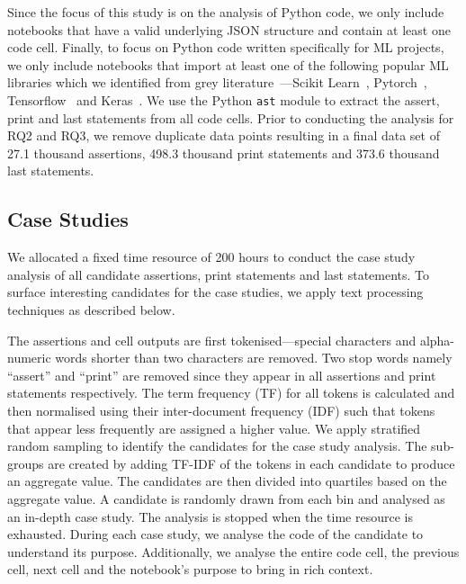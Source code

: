 Since the focus of this study is on the analysis of Python code, we only include notebooks that have a valid underlying JSON structure and contain at least one code cell. Finally, to focus on Python code written specifically for ML projects, we only include notebooks that import at least one of the following popular ML libraries which we identified from grey literature~\cite{datacampml,gfgml,jetbrainsml,kdnuggetml,courseraml}---Scikit Learn~\cite{virtanen2020scipy}, Pytorch~\cite{paszke2017automatic}, Tensorflow~\cite{abadi2015tensorflow} and Keras~\cite{chollet2015keras}. We use the Python \lstinline{ast} module to extract the assert, print and last statements from all code cells. Prior to conducting the analysis for RQ2 and RQ3, we remove duplicate data points resulting in a final data set of 27.1 thousand assertions, 498.3 thousand print statements and 373.6 thousand last statements.

\subsection{Case Studies}

We allocated a fixed time resource of 200 hours to conduct the case study analysis of all candidate assertions, print statements and last statements. To surface interesting candidates for the case studies, we apply text processing techniques as described below.

The assertions and cell outputs are first tokenised---special characters and alpha-numeric words shorter than two characters are removed. Two stop words namely ``assert'' and ``print'' are removed since they appear in all assertions and print statements respectively. The term frequency (TF) for all tokens is calculated and then normalised using their inter-document frequency (IDF) such that tokens that appear less frequently are assigned a higher value. We apply stratified random sampling to identify the candidates for the case study analysis. The sub-groups are created by adding TF-IDF of the tokens in each candidate to produce an aggregate value. The candidates are then divided into quartiles based on the aggregate value. A candidate is randomly drawn from each bin and analysed as an in-depth case study. The analysis is stopped when the time resource is exhausted. During each case study, we analyse the code of the candidate to understand its purpose. Additionally, we analyse the entire code cell, the previous cell, next cell and the notebook's purpose to bring in rich context.

